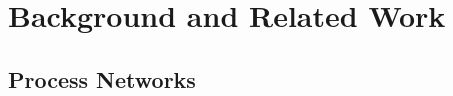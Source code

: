 \documentclass{sig-alternate}
\begin{document}
\section{Background and Related Work}
\label{pre}

\subsection{Process Networks}
\label{pre1}

\end{document}
